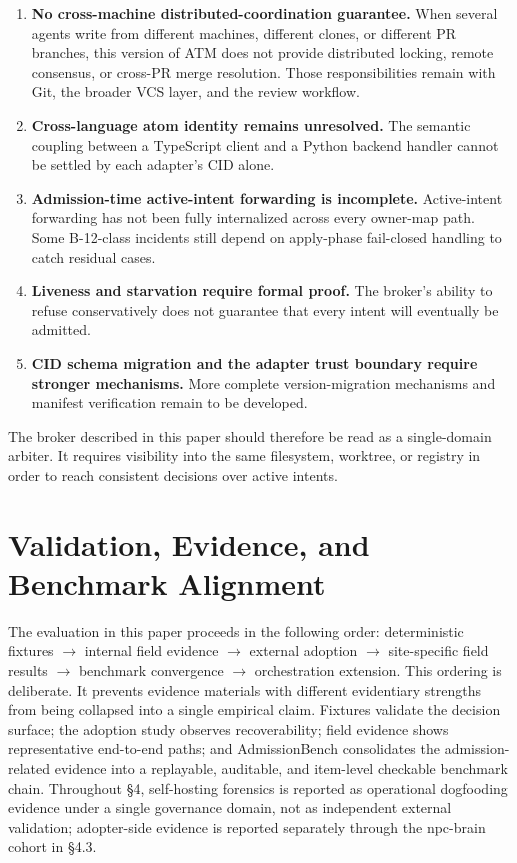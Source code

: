 \documentclass[9pt,letterpaper]{extarticle}
\begin{document}
\begin{enumerate}
\item \textbf{No cross-machine distributed-coordination guarantee.} When several agents write from different machines, different clones, or different PR branches, this version of ATM does not provide distributed locking, remote consensus, or cross-PR merge resolution. Those responsibilities remain with Git, the broader VCS layer, and the review workflow.
\item \textbf{Cross-language atom identity remains unresolved.} The semantic coupling between a TypeScript client and a Python backend handler cannot be settled by each adapter's CID alone.
\item \textbf{Admission-time active-intent forwarding is incomplete.} Active-intent forwarding has not been fully internalized across every owner-map path. Some B-12-class incidents still depend on apply-phase fail-closed handling to catch residual cases.
\item \textbf{Liveness and starvation require formal proof.} The broker's ability to refuse conservatively does not guarantee that every intent will eventually be admitted.
\item \textbf{CID schema migration and the adapter trust boundary require stronger mechanisms.} More complete version-migration mechanisms and manifest verification remain to be developed.
\end{enumerate}

The broker described in this paper should therefore be read as a single-domain arbiter. It requires visibility into the same filesystem, worktree, or registry in order to reach consistent decisions over active intents.

\section{Validation, Evidence, and Benchmark Alignment}

The evaluation in this paper proceeds in the following order: deterministic fixtures $\rightarrow$ internal field evidence $\rightarrow$ external adoption $\rightarrow$ site-specific field results $\rightarrow$ benchmark convergence $\rightarrow$ orchestration extension. This ordering is deliberate. It prevents evidence materials with different evidentiary strengths from being collapsed into a single empirical claim. Fixtures validate the decision surface; the adoption study observes recoverability; field evidence shows representative end-to-end paths; and AdmissionBench consolidates the admission-related evidence into a replayable, auditable, and item-level checkable benchmark chain. Throughout §4, self-hosting forensics is reported as operational dogfooding evidence under a single governance domain, not as independent external validation; adopter-side evidence is reported separately through the npc-brain cohort in §4.3.
\end{document}
